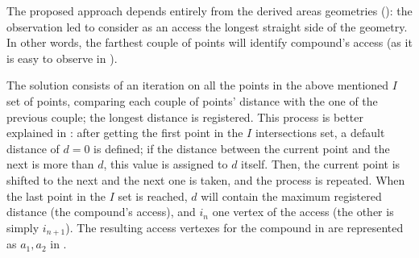                 The proposed approach depends entirely from the derived areas geometries (): the observation led to consider as an access the longest straight side of the geometry. In other words, the farthest couple of points will identify compound's access (as it is easy to observe in ).
                
                The solution consists of an iteration on all the points in the above mentioned $I$ set of points, comparing each couple of points' distance with the one of the previous couple; the longest distance is registered. This process is better explained in : after getting the first point in the $I$ intersections set, a default distance of $d=0$ is defined; if the distance between the current point and the next is more than $d$, this value is assigned to $d$ itself. Then, the current point is shifted to the next and the next one is taken, and the process is repeated. When the last point in the $I$ set is reached, $d$ will contain the maximum registered distance (the compound's access), and $i_n$ one vertex of the access (the other is simply $i_{n+1}$). The resulting access vertexes for the compound in  are represented as $a_1, a_2$ in .

